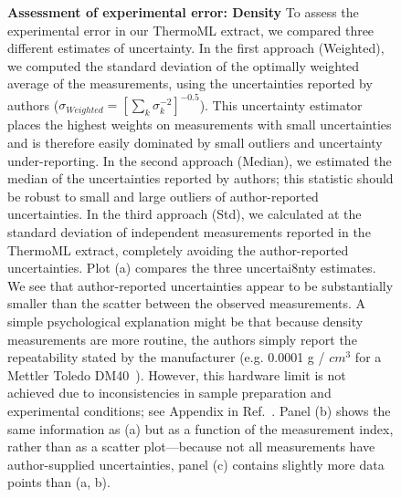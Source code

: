 \documentclass[aip, jcp, reprint]{revtex4-1}  %
\begin{document}
\begin{figure}
\caption{{\bf Assessment of experimental error: Density}
To assess the experimental error in our ThermoML extract, we compared three different estimates of uncertainty.  
In the first approach (Weighted), we computed the standard deviation of the optimally weighted average of the measurements, using the uncertainties reported by authors ($\sigma_{Weighted} = [\sum_k \sigma_k^{-2}]^{-0.5}$).
This uncertainty estimator places the highest weights on measurements with small uncertainties and is therefore easily dominated by small outliers and uncertainty under-reporting.
In the second approach (Median), we estimated the median of the uncertainties reported by authors; this statistic should be robust to small and large outliers of author-reported uncertainties.
In the third approach (Std), we calculated at the standard deviation of independent measurements reported in the ThermoML extract, completely avoiding the author-reported uncertainties.
Plot (a) compares the three uncertai8nty estimates.
We see that author-reported uncertainties appear to be substantially smaller than the scatter between the observed measurements.
A simple psychological explanation might be that because density measurements are more routine, the authors simply report the repeatability stated by the manufacturer (e.g. 0.0001 g / $cm^{3}$ for a Mettler Toledo DM40~\cite{mettlertoledo}).  
However, this hardware limit is not achieved due to inconsistencies in sample preparation and experimental conditions; see Appendix in Ref.~\cite{chirico2013improvement}.  
Panel (b) shows the same information as (a) but as a function of the measurement index, rather than as a scatter plot---because not all measurements have author-supplied uncertainties, panel (c) contains slightly more data points than (a, b).  
}
\label{figure:ErrorAnalysisDensity}

\end{figure}



\clearpage
\end{document}

